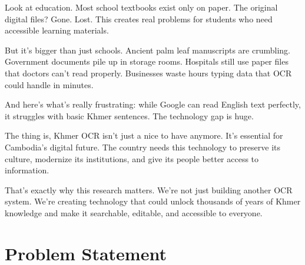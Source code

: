 \begin{table}[ht]
    \caption{Why Khmer OCR is Desperately Needed}
    \vspace{10pt}
    \label{sec:textbook}
\end{table}

Look at education. Most school textbooks exist only on paper. The original digital files? Gone. Lost. This creates real problems for students who need accessible learning materials.

But it's bigger than just schools. Ancient palm leaf manuscripts are crumbling. Government documents pile up in storage rooms. Hospitals still use paper files that doctors can't read properly. Businesses waste hours typing data that OCR could handle in minutes.

And here's what's really frustrating: while Google can read English text perfectly, it struggles with basic Khmer sentences. The technology gap is huge.

The thing is, Khmer OCR isn't just a nice to have anymore. It's essential for Cambodia's digital future. The country needs this technology to preserve its culture, modernize its institutions, and give its people better access to information.

That's exactly why this research matters. We're not just building another OCR system. We're creating technology that could unlock thousands of years of Khmer knowledge and make it searchable, editable, and accessible to everyone.


\section{Problem Statement}
\label{sec:problem}


